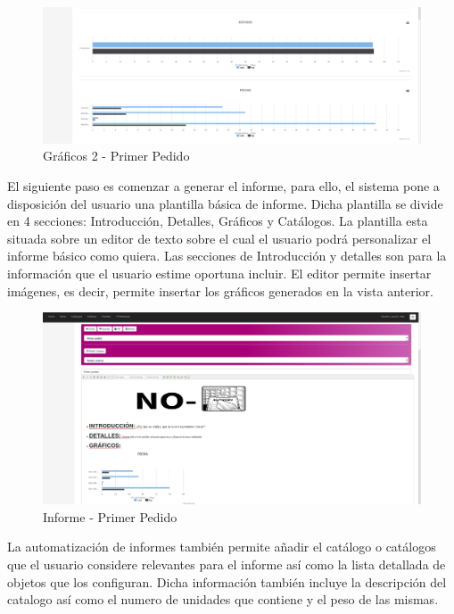 \documentclass[a4paper,11pt]{book}
\begin{document}
\begin{figure}[H] 
\centering 
\includegraphics[scale=0.25]{imagenes/pruebas/g2.png}
\caption{ Gráficos 2 - Primer Pedido\cite{propio}}
\end{figure}

El siguiente paso es comenzar a generar el informe, para ello, el sistema pone a disposición del usuario una plantilla básica de informe. Dicha plantilla se divide en 4 secciones: Introducción, Detalles, Gráficos y Catálogos. La plantilla esta situada sobre un editor de texto sobre el cual el usuario podrá personalizar el informe básico como quiera. Las secciones de Introducción y detalles son para la información que el usuario estime oportuna incluir. 
El editor permite insertar imágenes, es decir, permite insertar los gráficos generados en la vista anterior.

\begin{figure}[H] 
\centering 
\includegraphics[scale=0.25]{imagenes/pruebas/informe_1.png}
\caption{ Informe - Primer Pedido\cite{propio}}
\end{figure}

La automatización de informes también permite añadir el catálogo o catálogos que el usuario considere relevantes para el informe así como la lista detallada de objetos que los configuran. Dicha información también incluye la descripción del catalogo así como el numero de unidades que contiene y el peso de las mismas.  
\end{document}
